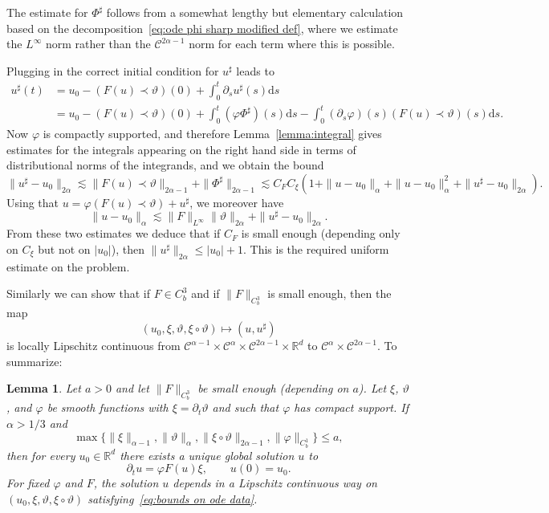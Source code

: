 \documentclass[11pt,a4paper]{article}
\newcommand{\mathd}{\mathrm{d}}
\newtheorem{lemma}[theorem]{Lemma}
\theoremstyle{remark}
\newcommand{\R}{\mathbb{R}}
\newcommand{\CC}{\ensuremath{\mathscr{C}}}
\begin{document}
The estimate for $\Phi^{\sharp}$ follows from a somewhat lengthy but
elementary calculation based on the decomposition~\eqref{eq:ode phi sharp modified def}, where we estimate the $L^{\infty}$ norm rather than the
$\CC^{2 \alpha -1}$ norm for each term where this is possible.

Plugging in the correct initial condition for $u^{\sharp}$ leads to
\begin{align*}
   u^{\sharp} ( t ) &= u_{0} - ( F ( u ) \prec \vartheta ) ( 0 ) + \int_{0}^{t}\partial_{s} u^{\sharp} ( s ) \mathd s \\
   & =u_{0} - ( F ( u ) \prec \vartheta ) ( 0 ) + \int_{0}^{t} (\varphi \Phi^{\sharp}) ( s ) \mathd s- \int_{0}^{t} ( \partial_{s} \varphi ) ( s )  ( F ( u ) \prec \vartheta ) ( s ) \mathd s.
\end{align*}
Now $\varphi$ is compactly supported, and therefore Lemma~\ref{lemma:integral} gives estimates for the integrals appearing on
the right hand side in terms of distributional norms of the integrands, and we
obtain the bound
\[
   \| u^{\sharp} -u_{0} \|_{2 \alpha} \lesssim  \| F ( u ) \prec \vartheta \|_{2 \alpha -1} + \| \Phi^{\sharp} \|_{2 \alpha -1} \lesssim C_{F} C_{\xi} ( 1+ \| u-u_{0} \|_{\alpha} + \| u-u_{0} \|^{2}_{\alpha} + \| u^{\sharp} -u_{0} \|_{2 \alpha} ).
\]
Using that $u= \varphi (F ( u ) \prec \vartheta ) +u^{\sharp}$, we moreover have
\[
   \| u-u_{0} \|_{\alpha} \lesssim  \| F \|_{L^{\infty}} \| \vartheta \|_{2 \alpha} + \| u^{\sharp} -u_{0} \|_{2 \alpha}.
\]
From these two estimates we deduce that if $C_{F}$ is small enough (depending only on $C_{\xi}$ but not on $| u_{0} |$), then $\| u^{\sharp} \|_{2 \alpha} \leqslant | u_{0} | +1$. 
This is the required uniform estimate on the problem.



Similarly we can show that if $F \in C^{3}_{b}$ and if $\| F \|_{C^{3}_{b}}$
is small enough, then the map
\[
   (u_0, \xi , \vartheta , \xi \circ   \vartheta) \mapsto ( u,u^{\sharp} )
\]
is locally Lipschitz continuous from $\CC^{\alpha -1} \times \CC^{\alpha}\times \CC^{2 \alpha -1} \times \mathbb{R}^{d}$ to $\CC^{\alpha} \times \CC^{2 \alpha -1}$. To summarize:

\begin{lemma}\label{lemma:ode conditional existence uniqueness}
  Let $a>0$ and let $\| F\|_{C^{3}_{b}}$ be small enough (depending on $a$). Let $\xi$, $\vartheta$,
  and $\varphi$ be smooth functions with $\xi = \partial_{t} \vartheta$ and
  such that $\varphi$ has compact support. If $\alpha >1/3$ and
  \begin{equation}\label{eq:bounds on ode data}
     \max \{ \| \xi \|_{\alpha -1} , \| \vartheta \|_{\alpha} , \| \xi \circ \vartheta \|_{2 \alpha -1} , \| \varphi \|_{C^{1}_{b}} \} \leqslant a,
  \end{equation}
  then for every $u_0 \in \R^d$ there exists a unique global solution $u$ to
  \[
     \partial_{t} u= \varphi F ( u ) \xi, \qquad u(0) = u_0.
  \]
  For fixed $\varphi$ and $F$, the solution $u$ depends in a Lipschitz continuous way on $(u_0, \xi, \vartheta , \xi \circ \vartheta)$ satisfying~\eqref{eq:bounds on ode data}.
\end{lemma}
\end{document}
